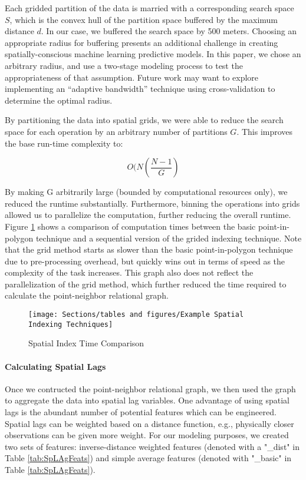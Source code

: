 \documentclass[12pt,]{article}
\let\oldparagraph\paragraph
\renewcommand{\paragraph}[1]{\oldparagraph{#1}\mbox{}}
\begin{document}
\noindent Each gridded partition of the data is married with a
corresponding search space \(S\), which is the convex hull of the
partition space buffered by the maximum distance \(d\). In our case, we
buffered the search space by 500 meters. Choosing an appropriate radius
for buffering presents an additional challenge in creating
spatially-conscious machine learning predictive models. In this paper,
we chose an arbitrary radius, and use a two-stage modeling process to
test the appropriateness of that assumption. Future work may want to
explore implementing an ``adaptive bandwidth'' technique using
cross-validation to determine the optimal radius.

By partitioning the data into spatial grids, we were able to reduce the
search space for each operation by an arbitrary number of partitions
\(G\). This improves the base run-time complexity to:

\[
O(N(\frac{N-1}{G})
\]

\noindent By making G arbitrarily large (bounded by computational
resources only), we reduced the runtime substantially. Furthermore,
binning the operations into grids allowed us to parallelize the
computation, further reducing the overall runtime. Figure
\ref{fig:Spatial Indexing Process} shows a comparison of computation
times between the basic point-in-polygon technique and a sequential
version of the grided indexing technique. Note that the grid method
starts as slower than the basic point-in-polygon technique due to
pre-processing overhead, but quickly wins out in terms of speed as the
complexity of the task increases. This graph also does not reflect the
parallelization of the grid method, which further reduced the time
required to calculate the point-neighbor relational graph.

\begin{figure}[H]
\texttt{[image: Sections/tables and figures/Example Spatial Indexing Techniques]} \caption{Spatial Index Time Comparison}\label{fig:Spatial Indexing Process}
\end{figure}

\hypertarget{calculating-spatial-lags}{%
\paragraph{Calculating Spatial Lags}\label{calculating-spatial-lags}}

Once we contructed the point-neighbor relational graph, we then used the
graph to aggregate the data into spatial lag variables. One advantage of
using spatial lags is the abundant number of potential features which
can be engineered. Spatial lags can be weighted based on a distance
function, e.g., physically closer observations can be given more weight.
For our modeling purposes, we created two sets of features:
inverse-distance weighted features (denoted with a "\_dist" in Table
\ref{tab:SpLAgFeats}) and simple average features (denoted with
"\_basic" in Table \ref{tab:SpLAgFeats}).
\end{document}
